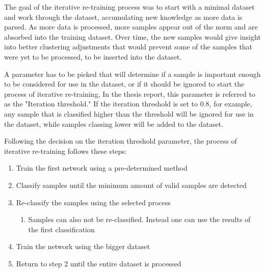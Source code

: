 The goal of the iterative re-training process was to start with a minimal dataset and work through the dataset, accumulating new knowledge as more data is parsed.
As more data is processed, more samples appear out of the norm and are absorbed into the training dataset.
Over time, the new samples would give insight into better clustering adjustments that would prevent some of the samples that were yet to be processed, to be inserted into the dataset.



A parameter has to be picked that will determine if a sample is important enough to be considered for use in the dataset, or if it should be ignored to start the process of iterative re-training,
In the thesis report, this parameter is referred to as the "Iteration threshold."
If the iteration threshold is set to 0.8, for example, any sample that is classified higher than the threshold will be ignored for use in the dataset, while samples classing lower will be added to the dataset.


Following the decision on the iteration threshold parameter, the process of iterative re-training follows these steps:
\begin{enumerate}
    \item Train the first network using a pre-determined method
    \item Classify samples until the minimum amount of valid samples are detected
    \item Re-classify the samples using the selected process
    \begin{enumerate}
        \item Samples can also not be re-classified. Instead one can use the results of the first classification
    \end{enumerate}
    \item Train the network using the bigger dataset
    \item Return to step 2 until the entire dataset is processed
\end{enumerate}

